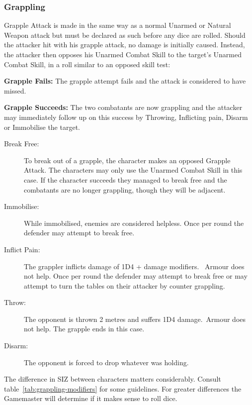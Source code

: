 \subsubsection{Grappling}
Grapple Attack is made in the same way as a normal Unarmed or Natural Weapon attack but must be declared as such before any dice are rolled. Should the attacker hit with his grapple attack, no damage is initially caused. Instead, the attacker then opposes his Unarmed Combat Skill to the target’s Unarmed Combat Skill, in a roll similar to an opposed skill test:
\begin{rpg-list}
\item \textbf{Grapple Fails:} The grapple attempt fails and the attack is considered to have missed. 
\item \textbf{Grapple Succeeds:} The two combatants are now grappling and the attacker may immediately follow up on this success by Throwing, Inflicting pain, Disarm or Immobilise the target.
\end{rpg-list}


\begin{description}
\item[Break Free:] To break out of a grapple, the character makes an opposed Grapple Attack. The characters may only use the Unarmed Combat Skill in this case. If the character succeeds they managed to break free and the combatants are no longer grappling, though they will be adjacent.
\item[Immobilise:] While immobilised, enemies are considered helpless. Once per round the defender may attempt to break free.
\item[Inflict Pain:] The grappler inflicts damage of 1D4 + damage modifiers.  Armour does not help. Once per round the defender may attempt to break free or may attempt to turn the tables on their attacker by counter grappling.
\item[Throw:] The opponent is thrown 2 metres and suffers 1D4 damage. Armour does not help. The grapple ends in this case.
\item[Disarm:] The opponent is forced to drop whatever was holding.
\end{description}

The difference in SIZ between characters matters considerably. %
Consult table~\ref{tab:grappling-modifiers} for some guidelines. For greater differences the Gamemaster will determine if it makes sense to roll dice.

